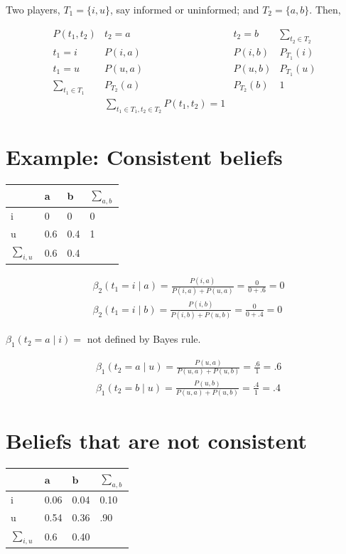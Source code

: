 \documentclass[10pt]{article}
\begin{document}
Two players, $T_{1}=\{i, u\}$, say informed or uninformed; and $T_{2}=\{a, b\}$. Then,

$$
\begin{array}{llll}
P\left(t_{1}, t_{2}\right) & t_{2}=a & t_{2}=b & \sum_{t_{2} \in T_{2}} \\
\hline t_{1}=i & P(i, a) & P(i, b) & P_{T_{1}}(i) \\
\hline t_{1}=u & P(u, a) & P(u, b) & P_{T_{1}}(u) \\
\hline \sum_{t_{1} \in T_{1}} & P_{T_{2}}(a) & P_{T_{2}}(b) & 1 \\
& \sum_{t_{1} \in T_{1}, t_{2} \in T_{2}} P\left(t_{1}, t_{2}\right)=1 &
\end{array}
$$

\section*{Example: Consistent beliefs}
\begin{center}
\begin{tabular}{llll}
 & a & b & $\sum_{a, b}$ \\
\hline
i & 0 & 0 & 0 \\
\hline
u & 0.6 & 0.4 & 1 \\
\hline
$\sum_{i, u}$ & 0.6 & 0.4 &  \\
\hline
\end{tabular}
\end{center}

$$
\begin{aligned}
& \beta_{2}\left(t_{1}=i \mid a\right)=\frac{P(i, a)}{P(i, a)+P(u, a)}=\frac{0}{0+.6}=0 \\
& \beta_{2}\left(t_{1}=i \mid b\right)=\frac{P(i, b)}{P(i, b)+P(u, b)}=\frac{0}{0+.4}=0
\end{aligned}
$$

$\beta_{1}\left(t_{2}=a \mid i\right)=$ not defined by Bayes rule.

$$
\begin{aligned}
& \beta_{1}\left(t_{2}=a \mid u\right)=\frac{P(u, a)}{P(u, a)+P(u, b)}=\frac{.6}{1}=.6 \\
& \beta_{1}\left(t_{2}=b \mid u\right)=\frac{P(u, b)}{P(u, a)+P(u, b)}=\frac{.4}{1}=.4
\end{aligned}
$$

\section*{Beliefs that are not consistent}
\begin{center}
\begin{tabular}{llll}
 & $\mathbf{a}$ & $\mathbf{b}$ & $\sum_{a, b}$ \\
\hline
i & 0.06 & 0.04 & 0.10 \\
\hline
u & 0.54 & 0.36 & .90 \\
\hline
$\sum_{i, u}$ & 0.6 & 0.40 &  \\
\hline
\end{tabular}
\end{center}
\end{document}
